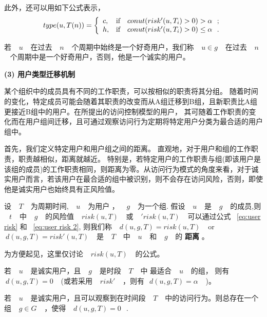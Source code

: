 此外，还可以用如下公式表示，
\begin{equation}\label{eq:user type Tn 2}
type(u,T(n))=
\left\{
\begin{array}{ll}
c, & \hbox{if ~$~conut(risk'(u,T_i) > 0) > \alpha~$~;} \\
h, & \hbox{if ~$~conut(risk'(u,T_i) > 0) \leq \alpha~$~.} \\
\end{array}
\right.
\end{equation}

若 ~$~u~$~ 在过去 ~$~n~$~ 个周期中始终是一个好奇用户，我们称 ~$~u \in g~$~ 在过去 ~$~n~$~ 个周期中是一个好奇用户，否则，他是一个诚实的用户。

\textbf{(3) 用户类型迁移机制}

某个组织中的成员具有不同的工作职责，可以按相似的职责将其分组。 随着时间的变化，特定成员可能会随着其职责的改变而从A组迁移到B组，且新职责比A组更接近B组中的用户。在所提出的访问控制模型的用户， 其可随着工作职责的变化而在用户组间迁移，且可通过观察访问行为定期将特定用户分类为最合适的用户组中。

首先，我们定义特定用户和用户组之间的距离。 直观地，对于用户和组的工作职责，职责越相似，距离就越近。 特别是，若特定用户的工作职责与组(即该用户是该组的成员)的工作职责相同，则距离为零。从访问行为模式的角度来看，对于诚实用户而言，若该用户在最合适的组中被识别，则不会存在访问风险，否则，即使他是诚实用户也始终具有正风险值。

\begin{definition}%
	\label{user-group distance}
	设 ~$~T~$~ 为周期时间, ~$~u~$~ 为用户 ， ~$~g~$~ 为一个组. 假设 ~$~u~$~ 是 ~$~g~$~ 的成员,则 ~$~t~$~ 中 ~$~g~$~ 的风险值 ~$~risk(u,T)~$~ 或 ~$~'risk(u,T)~$~ 可以通过公式 ~\ref{eq:user risk} 和 ~\ref{eq:user risk 2}, 则我们称 ~$~d(u,g,T)=risk(u,T)~$~ or ~$~d(u,g,T)=risk'(u,T)~$~ 是 ~$~T~$~ 中 ~$~u~$~ 和 ~$~g~$~ 的 \textbf{距离} 。
\end{definition}

为方便起见，这里仅讨论 ~$~risk(u,T)~$~ 的公式。

\begin{claim}[用户组距离]
	若 ~$~u~$~ 是诚实用户，且 ~$~g~$~ 是时段 ~$~T~$~ 中 最适合 ~$~u~$~ 的组， 则有 ~$~d(u,g,T)=0~$~ (或若采用 ~$~risk'~$~ ，则有~$~d(u,g,T)=\alpha~$~ )。
\end{claim}

\begin{claim}
	若 ~$~u~$~ 是诚实用户，且可以观察到在时间段 ~$~T~$~ 中的访问行为。则总存在一个组 ~$~g \in G~$~ ，使得 ~$~d(u,g,T)=0~$~.
\end{claim}


